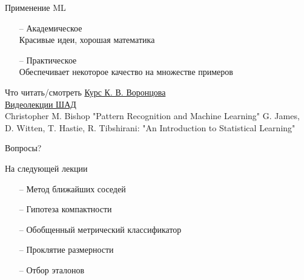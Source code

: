 \documentclass[10pt]{beamer}
\begin{document}
\begin{frame}{Применение ML}
	\begin{itemize}
	  \item[--] Академическое\\
	Красивые идеи, хорошая математика
	  \item[--] Практическое\\
	  Обеспечивает некоторое качество на множестве примеров\\
	\end{itemize}
\end{frame}

\begin{frame}{Что читать/смотреть}
  \href{http://www.machinelearning.ru/wiki/images/6/6d/Voron-ML-1.pdf}{Курс К. В. Воронцова}\\
	\href{https://yandexdataschool.ru/edu-process/courses/machine-learning}{Видеолекции ШАД}\\
	Christopher M. Bishop "Pattern Recognition and Machine Learning"
	G. James, D. Witten, T. Hastie, R. Tibshirani: "An Introduction to Statistical Learning" 	
\end{frame}

\begin{frame}[standout]
  Вопросы?
\end{frame}

\appendix

\begin{frame}{На следующей лекции}
	\begin{itemize}
	  \item[--] Метод ближайших соседей
	  \item[--] Гипотеза компактности
	  \item[--] Обобщенный метрический классификатор
	  \item[--] Проклятие размерности  
	  \item[--] Отбор эталонов     
	\end{itemize}
\end{frame}
\end{document}
